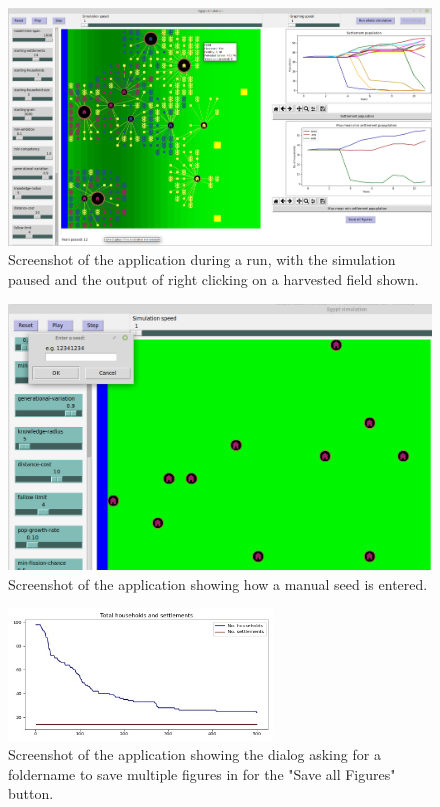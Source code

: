 \documentclass[12pt]{article}
\begin{document}
	\begin{figure}[!htb]
		\includegraphics[width=15cm]{RightClickOnHarvestedField}
		\caption{Screenshot of the application during a run, with the simulation paused and the output of right clicking on a harvested field shown.}
		\label{fig:ClickOnHarvested}
	\end{figure}
	
	\begin{figure}[!htb]
		\includegraphics[width=15cm]{SeedEntry}
		\caption{Screenshot of the application showing how a manual seed is entered.}
		\label{fig:Seed Entry}
	\end{figure}
	
	\begin{figure}[!htb]
		\includegraphics[width=7cm]{Default_values_run_1_A}
		\caption{Screenshot of the application showing the dialog asking for a foldername to save multiple figures in for the "Save all Figures" button.}
		\label{fig:Default_values_run_1_A}
	\end{figure}
\end{document}
